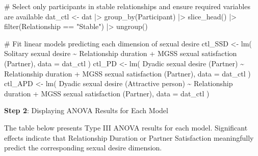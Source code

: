 \documentclass[
  bookmarksnumbered]{article}
\newenvironment{Shaded}{\begin{snugshade}}{\end{snugshade}}
\newcommand{\AttributeTok}[1]{\textcolor[rgb]{0.80,0.80,0.80}{#1}}
\newcommand{\CommentTok}[1]{\textcolor[rgb]{0.50,0.62,0.50}{#1}}
\newcommand{\FunctionTok}[1]{\textcolor[rgb]{0.94,0.94,0.56}{#1}}
\newcommand{\NormalTok}[1]{\textcolor[rgb]{0.80,0.80,0.80}{#1}}
\newcommand{\OtherTok}[1]{\textcolor[rgb]{0.94,0.94,0.56}{#1}}
\newcommand{\SpecialCharTok}[1]{\textcolor[rgb]{0.86,0.64,0.64}{#1}}
\newcommand{\StringTok}[1]{\textcolor[rgb]{0.80,0.58,0.58}{#1}}
\begin{document}
\begin{Shaded}
\begin{Highlighting}[]
\CommentTok{\# Select only participants in stable relationships and ensure required variables are available}
\NormalTok{dat\_ctl }\OtherTok{\textless{}{-}}\NormalTok{ dat }\SpecialCharTok{|\textgreater{}}
  \FunctionTok{group\_by}\NormalTok{(Participant) }\SpecialCharTok{|\textgreater{}}
  \FunctionTok{slice\_head}\NormalTok{() }\SpecialCharTok{|\textgreater{}}
  \FunctionTok{filter}\NormalTok{(Relationship }\SpecialCharTok{==} \StringTok{"Stable"}\NormalTok{) }\SpecialCharTok{|\textgreater{}}
  \FunctionTok{ungroup}\NormalTok{()}

\CommentTok{\# Fit linear models predicting each dimension of sexual desire}
\NormalTok{ctl\_SSD }\OtherTok{\textless{}{-}} \FunctionTok{lm}\NormalTok{(}
  \StringTok{\textasciigrave{}}\AttributeTok{Solitary sexual desire}\StringTok{\textasciigrave{}} \SpecialCharTok{\textasciitilde{}}
    \StringTok{\textasciigrave{}}\AttributeTok{Relationship duration}\StringTok{\textasciigrave{}} \SpecialCharTok{+} \StringTok{\textasciigrave{}}\AttributeTok{MGSS sexual satisfaction (Partner)}\StringTok{\textasciigrave{}}\NormalTok{,}
  \AttributeTok{data =}\NormalTok{ dat\_ctl}
\NormalTok{)}
\NormalTok{ctl\_PD }\OtherTok{\textless{}{-}} \FunctionTok{lm}\NormalTok{(}
  \StringTok{\textasciigrave{}}\AttributeTok{Dyadic sexual desire (Partner)}\StringTok{\textasciigrave{}} \SpecialCharTok{\textasciitilde{}}
    \StringTok{\textasciigrave{}}\AttributeTok{Relationship duration}\StringTok{\textasciigrave{}} \SpecialCharTok{+} \StringTok{\textasciigrave{}}\AttributeTok{MGSS sexual satisfaction (Partner)}\StringTok{\textasciigrave{}}\NormalTok{,}
  \AttributeTok{data =}\NormalTok{ dat\_ctl}
\NormalTok{)}
\NormalTok{ctl\_APD }\OtherTok{\textless{}{-}} \FunctionTok{lm}\NormalTok{(}
  \StringTok{\textasciigrave{}}\AttributeTok{Dyadic sexual desire (Attractive person)}\StringTok{\textasciigrave{}} \SpecialCharTok{\textasciitilde{}}
    \StringTok{\textasciigrave{}}\AttributeTok{Relationship duration}\StringTok{\textasciigrave{}} \SpecialCharTok{+} \StringTok{\textasciigrave{}}\AttributeTok{MGSS sexual satisfaction (Partner)}\StringTok{\textasciigrave{}}\NormalTok{,}
  \AttributeTok{data =}\NormalTok{ dat\_ctl}
\NormalTok{)}
\end{Highlighting}
\end{Shaded}

\textbf{Step 2}: Displaying ANOVA Results for Each Model

The table below presents Type III ANOVA results for each model. Significant effects indicate that Relationship Duration or Partner Satisfaction meaningfully predict the corresponding sexual desire dimension.
\end{document}
